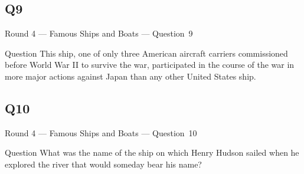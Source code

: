 \documentclass[11pt]{beamer}
\begin{document}
\subsection*{Q9}
\begin{frame}[t]{Round 4 --- Famous Ships and Boats --- \mbox{Question 9}}
    \vspace{-0.5em}
    \begin{block}{Question}
        This ship, one of only three American aircraft carriers commissioned before World War II to survive the war, participated in the course of the war in more major actions against Japan than any other United States ship.
    \end{block}
\end{frame}
\subsection*{Q10}
\begin{frame}[t]{Round 4 --- Famous Ships and Boats --- \mbox{Question 10}}
    \vspace{-0.5em}
    \begin{block}{Question}
        What was the name of the ship on which Henry Hudson sailed when he explored the river that would someday bear his name?
    \end{block}
\end{frame}
\end{document}
